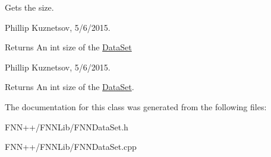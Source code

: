Gets the size. 

Phillip Kuznetsov, 5/6/2015. 

\begin{DoxyReturn}{Returns}
An int size of the \hyperlink{classfnn_1_1_data_set}{Data\+Set} 
\end{DoxyReturn}


Phillip Kuznetsov, 5/6/2015. 

\begin{DoxyReturn}{Returns}
An int size of the \hyperlink{classfnn_1_1_data_set}{Data\+Set}. 
\end{DoxyReturn}


The documentation for this class was generated from the following files\+:\begin{DoxyCompactItemize}
\item 
F\+N\+N++/\+F\+N\+N\+Lib/F\+N\+N\+Data\+Set.\+h\item 
F\+N\+N++/\+F\+N\+N\+Lib/F\+N\+N\+Data\+Set.\+cpp\end{DoxyCompactItemize}

